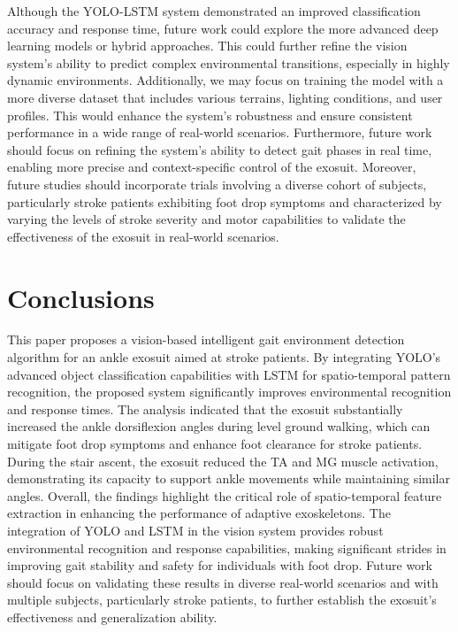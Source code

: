\documentclass[actuators,article,accept,pdftex,moreauthors]{Definitions/mdpi}
\begin{document}
Although the YOLO-LSTM system demonstrated an improved classification accuracy and response time, future work could explore the more advanced deep learning models or hybrid approaches. This could further refine the vision system's ability to predict complex environmental transitions, especially in highly dynamic environments. Additionally, we may focus on training the model with a more diverse dataset that includes various terrains, lighting conditions, and user profiles. This would enhance the system’s robustness and ensure consistent performance in a wide range of real-world scenarios. Furthermore, future work should focus on refining the system's ability to detect gait phases in real time, enabling more precise and context-specific control of the exosuit. {Moreover, future studies should incorporate trials involving a diverse cohort of subjects, particularly stroke patients exhibiting foot drop symptoms and characterized by varying the levels of stroke severity and motor capabilities to validate the effectiveness of the exosuit in real-world scenarios.}


\section{Conclusions}
This paper proposes a vision-based intelligent gait environment detection algorithm for an ankle exosuit aimed at stroke patients. By integrating YOLO's advanced object classification capabilities with LSTM for spatio-temporal pattern recognition, the proposed system significantly improves environmental recognition and response times. The analysis indicated that the exosuit substantially increased the ankle dorsiflexion angles during level ground walking, which can mitigate foot drop symptoms and enhance foot clearance for stroke patients. During the stair ascent, the exosuit reduced the TA and MG muscle activation, demonstrating its capacity to support ankle movements while maintaining similar angles. Overall, the findings highlight the critical role of spatio-temporal feature extraction in enhancing the performance of adaptive exoskeletons. The integration of YOLO and LSTM in the vision system provides robust environmental recognition and response capabilities, making significant strides in improving gait stability and safety for individuals with foot drop. Future work should focus on validating these results in diverse real-world scenarios and with multiple subjects, particularly stroke patients, to further establish the exosuit's effectiveness and generalization ability. 
\end{document}
